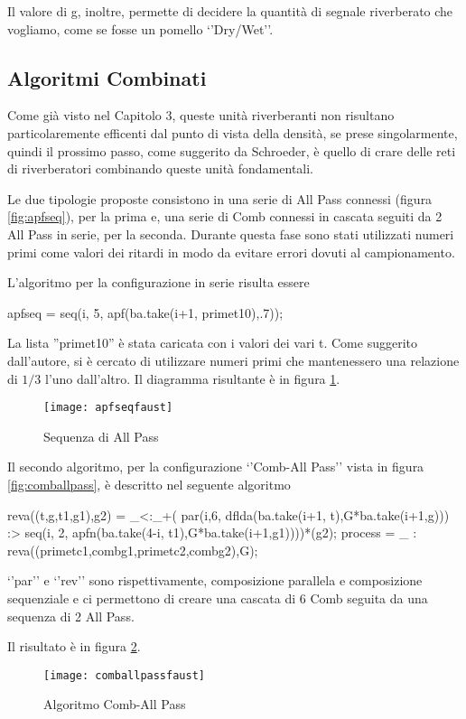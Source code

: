 Il valore di g, inoltre, permette di decidere la quantità di segnale riverberato che vogliamo, come se fosse un pomello `'Dry/Wet''.

\subsection{Algoritmi Combinati}
Come già visto nel Capitolo 3, queste unità riverberanti non risultano particolaremente efficenti dal punto di vista della densità, se prese singolarmente, quindi il prossimo passo, come suggerito da Schroeder, è quello di crare delle reti di riverberatori combinando queste unità fondamentali.

\bigskip

Le due tipologie proposte consistono in una serie di All Pass connessi (figura \ref{fig:apfseq}), per la prima e, una serie di Comb connessi in cascata seguiti da 2 All Pass in serie, per la seconda.
Durante questa fase sono stati utilizzati numeri primi come valori dei ritardi in modo da evitare errori dovuti al campionamento.

L'algoritmo per la configurazione in serie risulta essere

\begin{code}
apfseq =  seq(i, 5, apf(ba.take(i+1, primet10),.7));
\end{code}

La lista ''primet10'' è stata caricata con i valori dei vari t. Come suggerito dall'autore, si è cercato di utilizzare numeri primi che mantenessero una relazione di $1/3$ l'uno dall'altro.
Il diagramma risultante è in figura \ref{fig:apfseqfaust}.

\begin{figure}[htp]
\centering
\texttt{[image: apfseqfaust]}
\caption{Sequenza di All Pass}
\label{fig:apfseqfaust}
\end{figure}

Il secondo algoritmo, per la configurazione `'Comb-All Pass'' vista in figura \ref{fig:comballpass}, è descritto nel seguente algoritmo

\begin{code}
reva((t,g,t1,g1),g2) = _<:_+(
    par(i,6, dflda(ba.take(i+1, t),G*ba.take(i+1,g))) :> 
    seq(i, 2, apfn(ba.take(4-i, t1),G*ba.take(i+1,g1))))*(g2);
process = _ : reva((primetc1,combg1,primetc2,combg2),G);
\end{code}

`'par'' e `'rev'' sono rispettivamente, composizione parallela e composizione sequenziale e ci permettono di creare una cascata di 6 Comb seguita da una sequenza di 2 All Pass. 

Il risultato è in figura \ref{fig:comballpassfaust}.

\begin{figure}[htp]
\centering
\texttt{[image: comballpassfaust]}
\caption{Algoritmo Comb-All Pass}
\label{fig:comballpassfaust}
\end{figure}